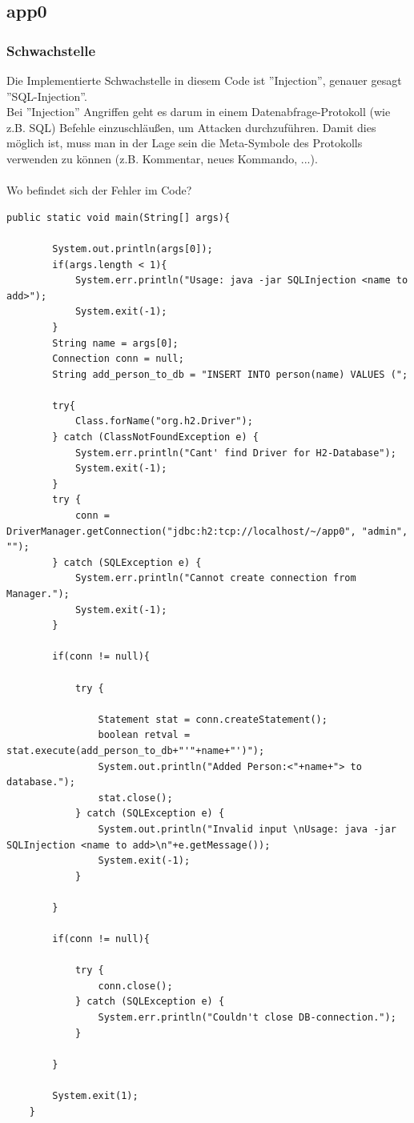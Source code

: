 \documentclass[12pt,a4paper,titlepage,oneside]{scrartcl}
\begin{document}
\subsection{app0}

\subsubsection{Schwachstelle}

Die Implementierte Schwachstelle in diesem Code ist ''Injection'', genauer gesagt ''SQL-Injection''. \\
Bei ''Injection'' Angriffen geht es darum in einem Datenabfrage-Protokoll (wie z.B. SQL) Befehle einzuschläußen, um Attacken durchzuführen. Damit dies möglich ist, muss man in der Lage sein die Meta-Symbole des Protokolls verwenden zu können (z.B. Kommentar, neues Kommando, ...). \\
\\
Wo befindet sich der Fehler im Code?

\begin{lstlisting}[caption=Code mit Schwachstelle,label=code:app0a,style=c]
public static void main(String[] args){

		System.out.println(args[0]);
        if(args.length < 1){
            System.err.println("Usage: java -jar SQLInjection <name to add>");
            System.exit(-1);
        }
        String name = args[0];
        Connection conn = null;
        String add_person_to_db = "INSERT INTO person(name) VALUES (";

        try{
            Class.forName("org.h2.Driver");
        } catch (ClassNotFoundException e) {
            System.err.println("Cant' find Driver for H2-Database");
            System.exit(-1);
        }
        try {
            conn = DriverManager.getConnection("jdbc:h2:tcp://localhost/~/app0", "admin", "");
        } catch (SQLException e) {
            System.err.println("Cannot create connection from Manager.");
            System.exit(-1);
        }

        if(conn != null){

            try {

                Statement stat = conn.createStatement();
                boolean retval = stat.execute(add_person_to_db+"'"+name+"')");
                System.out.println("Added Person:<"+name+"> to database.");
                stat.close();
            } catch (SQLException e) {
                System.out.println("Invalid input \nUsage: java -jar SQLInjection <name to add>\n"+e.getMessage());
                System.exit(-1);
            }

        }

        if(conn != null){

            try {
                conn.close();
            } catch (SQLException e) {
                System.err.println("Couldn't close DB-connection.");
            }

        }

        System.exit(1);
    }
\end{lstlisting}
\end{document}
